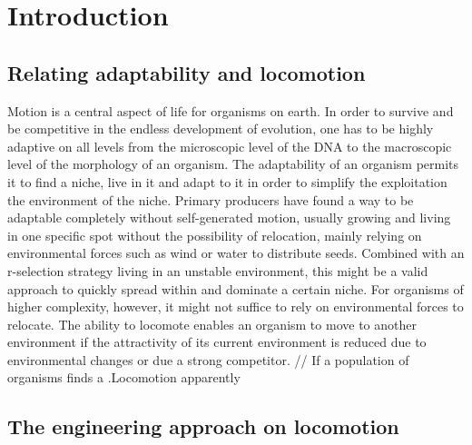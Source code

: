 \documentclass[main]{subfiles}
\begin{document}
\setcounter{chapter}{0}

\chapter{Introduction} %

\label{Chapter\thechapter} %


\section{Relating adaptability and locomotion}

Motion is a central aspect of life for organisms on earth. In order to survive and be competitive in the endless development of evolution, one has to be highly adaptive on all levels from the microscopic level of the DNA to the macroscopic level of the morphology of an organism. The adaptability of an organism permits it to find a niche, live in it and adapt to it in order to simplify the exploitation the environment of the niche. Primary producers have found a way to be adaptable completely without self-generated motion, usually growing and living in one specific spot without the possibility of relocation, mainly relying on environmental forces such as wind or water to distribute seeds. Combined with an r-selection strategy living in an unstable environment, this might be a valid approach to quickly spread within and dominate a certain niche. For organisms of higher complexity, however, it might not suffice to rely on environmental forces to relocate. The ability to locomote enables an organism to move to another environment if the attractivity of its current environment is reduced due to environmental changes or due a strong competitor. // If a population of organisms finds a .Locomotion apparently 




\section{The engineering approach on locomotion}
\end{document}
